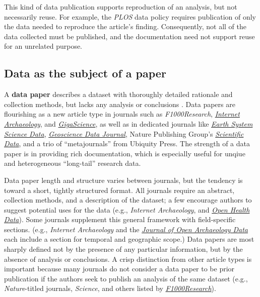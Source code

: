 \documentclass[10pt,a4paper,twocolumn]{article}
\begin{document}
{{This kind of data publication supports reproduction of an analysis, but not necessarily reuse.
For example, the \emph{PLOS} data policy requires publication of only the data needed to reproduce the article's finding.
Consequently, not all of the data collected must be published, and the documentation need not support reuse for an unrelated purpose.
 
\subsection*{Data as the subject of a paper}\label{paper-subject-data}

A \textbf{data paper} describes a dataset with thoroughly detailed rationale and collection methods, but lacks any analysis or conclusions \cite{newman_data_2009}.
Data papers are flourishing as a new article type in journals such as \emph{F1000Research}, \href{http://www.internetarchaeology.org/}{\emph{Internet Archaeology}}, and \href{http://www.gigasciencejournal.com/}{\emph{GigaScience}}, as well as in dedicated journals like \href{http://www.earth-system-science-data.net/}{\emph{Earth System Science Data}}\cite{pfeiffenberger_earth_2011}, \href{http://onlinelibrary.wiley.com/journal/10.1002/%28ISSN%292049-6060}{\emph{Geoscience Data Journal}}, Nature Publishing Group's \href{http://www.nature.com/scientificdata/}{\emph{Scientific Data}}, and a trio of ``metajournals'' from Ubiquity Press.
The strength of a data paper is in providing rich documentation, which is especially useful for unqiue and heterogeneous ``long-tail''\cite{heidorn_shedding_2008} research data.

Data paper length and structure varies between journals, but the tendency is toward a short, tightly structured format.
All journals require an abstract, collection methods, and a description of the dataset; a few encourage authors to suggest potential uses for the data (e.g., \emph{Internet Archaeology}, and \href{http://openhealthdata.metajnl.com/about/submissions#authorGuidelines}{\emph{Open Health Data}}).
Some journals supplement this general framework with field-specific sections. 
(e.g., \emph{Internet Archaeology} and the \href{http://openarchaeologydata.metajnl.com/}{\emph{Journal of Open Archaeology Data}} each include a section for temporal and geographic scope.)
Data papers are most sharply defined not by the presence of any particular information, but by the absence of analysis or conclusions.
A crisp distinction from other article types is important because many journals do not consider a data paper to be prior publication if the authors seek to publish an analysis of the same dataset (e.g., \textit{Nature}-titled journals, \emph{Science}, and others listed by \href{https://f1000research.com/data-policies}{\textit{F1000Research}}).

}}
\end{document}
